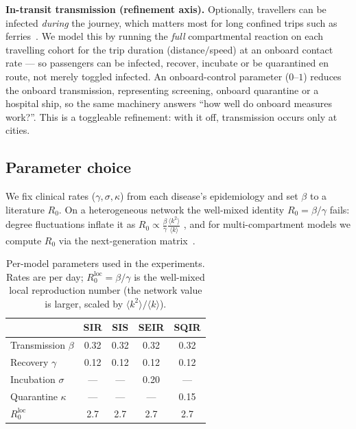 \documentclass{sigkddExp}
\begin{document}
\textbf{In-transit transmission (refinement axis).} Optionally, travellers can
be infected \emph{during} the journey, which matters most for long confined
trips such as ferries~\cite{rocklov:diamondprincess}. We model this by running
the \emph{full} compartmental reaction on each travelling cohort for the trip
duration (distance$/$speed) at an onboard contact rate --- so passengers can be
infected, recover, incubate or be quarantined en route, not merely toggled
infected. An onboard-control parameter ($0$--$1$) reduces the onboard
transmission, representing screening, onboard quarantine or a hospital ship, so
the same machinery answers ``how well do onboard measures work?''. This is a
toggleable refinement: with it off, transmission occurs only at cities.

\subsection{Parameter choice}
We fix clinical rates ($\gamma,\sigma,\kappa$) from each disease's
epidemiology and set $\beta$ to a literature $R_0$. On a heterogeneous
network the well-mixed identity $R_0=\beta/\gamma$ fails: degree
fluctuations inflate it as
$R_0\propto\frac{\beta}{\gamma}\frac{\langle k^2\rangle}{\langle k\rangle}$
\cite{pastorsatorras:scalefree}, and for multi-compartment models we
compute $R_0$ via the next-generation matrix~\cite{vandendriessche:r0}.

\begin{table}[t]
\centering
\caption{Per-model parameters used in the experiments. Rates are per day;
$R_0^{\text{loc}}=\beta/\gamma$ is the well-mixed local reproduction number
(the network value is larger, scaled by $\langle k^2\rangle/\langle k\rangle$).}
\label{tab:params}
\begin{tabular}{|l|c|c|c|c|}\hline
 & SIR & SIS & SEIR & SQIR\\\hline
Transmission $\beta$ & 0.32 & 0.32 & 0.32 & 0.32\\\hline
Recovery $\gamma$ & 0.12 & 0.12 & 0.12 & 0.12\\\hline
Incubation $\sigma$ & --- & --- & 0.20 & ---\\\hline
Quarantine $\kappa$ & --- & --- & --- & 0.15\\\hline
$R_0^{\text{loc}}$ & 2.7 & 2.7 & 2.7 & 2.7\\\hline
\end{tabular}
\end{table}
\end{document}
